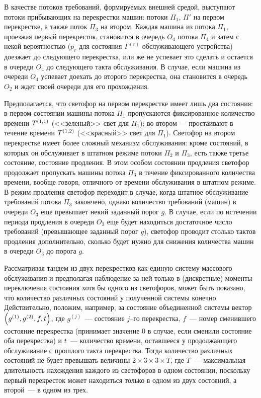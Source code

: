 \documentclass[a4paper,12pt,russian]{extarticle}
\newcommand{\ga}[1]{\Gamma^{\left( #1 \right)} }
\begin{document}
В качестве потоков требований, формируемых внешней средой, выступают потоки прибывающих на перекрестки машин: потоки $\Pi_1$, $\Pi'$ на первом перекрестке, а также поток $\Pi_3$ на втором. Каждая машина из потока $\Pi_1$, проезжая первый перекресток, становится в очередь $O_4$ потока $\Pi_4$ и затем с некой вероятностью ($p_r$ для состояния $\ga{r}$ обслуживающего устройства) доезжает до следующего перекрестка, или же не успевает это сделать и остается в очереди $O_4$ до следующего такта обслуживания. В случае, если машина из очереди $O_4$ успевает доехать до второго перекрестка, она становится в очередь $O_2$ и ждет своей очереди для его прохождения.

Предполагается, что светофор на первом перекрестке имеет лишь два состояния: в первом состоянии машины потока $\Pi_1$ пропускаются фиксированное количество времени $T^{\left(1,1\right)}$ (<<зеленый>> свет для $\Pi_1$); во втором --- простаивают в течение времени $T^{\left(1,2\right)}$ (<<красный>> свет для $\Pi_1$). Светофор на втором перекрестке имеет более сложный механизм обслуживания: кроме состояний, в которых он обслуживает в штатном режиме потоки $\Pi_2$ и $\Pi_3$, есть также третье состояние, состояние продления. В этом особом состоянии продления светофор продолжает пропускать машины потока $\Pi_3$ в течение фиксированного количества времени, вообще говоря, отличного от времени обслуживания в штатном режиме. В режим продления светофор переходит в случае, когда штатное обслуживание требований потока $\Pi_3$ закончено, однако количество требований (машин) в очереди $O_3$ еще превышает некий заданный порог $g$. В случае, если по истечении периода продления в очереди $O_3$ еще будет находиться достаточное число требований (превышающее заданный порог $g$), светофор проводит столько тактов продления дополнительно, сколько будет нужно для снижения количества машин в очереди $O_3$ до порога $g$.

Рассматривая тандем из двух перекрестков как единую систему массового обслуживания и предполагая наблюдение за ней только в (дискретные) моменты переключения состояния хотя бы одного из светофоров, может быть показано, что количество различных состояний у полученной системы конечно. Действительно, положим, например, за состояние объединенной системы вектор $\left(g^{(1)},g^{(2)}, f, t\right)$, где $g^{(j)}$~--- состояние $j$--го перекрестка, $f$~--- номер сменившего состояние перекрестка (принимает значение $0$ в случае, если сменили состояние оба перекрестка) и $t$~--- количество времени, оставшееся у продолжающего обслуживание с прошлого такта перекрестка. Тогда количество различных состояний не будет превышать величины  $2\times 3 \times 3 \times T$, где $T$~--- максимальная длительность нахождения каждого из светофоров в одном состоянии, поскольку первый перекресток может находиться только в одном из двух состояний, а второй~--- в одном из трех.
\end{document}
